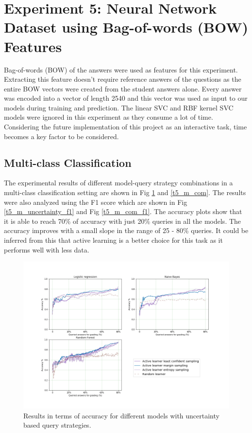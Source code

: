 \clearpage
\section{Experiment 5: Neural Network Dataset using Bag-of-words (BOW) Features}

Bag-of-words (BOW) of the answers were used as features for this experiment. Extracting this feature doesn't require reference answers of the questions as the entire BOW vectors were created from the student answers alone. Every answer was encoded into a vector of length 2540 and this vector was used as input to our models during training and prediction. The linear SVC and RBF kernel SVC models were ignored in this experiment as they consume a lot of time. Considering the future implementation of this project as an interactive task, time becomes a key factor to be considered.   

\subsection{Multi-class Classification}

The experimental results of different model-query strategy combinations in a multi-class classification setting are shown in Fig \ref{t5_m_uncertainty} and \ref{t5_m_com}. The results were also analyzed using the F1 score which are shown in Fig \ref{t5_m_uncertainty_f1} and Fig \ref{t5_m_com_f1}. The accuracy plots show that it is able to reach 70\% of accuracy with just 20\% queries in all the models. The accuracy improves with a small slope in the range of 25 - 80\% queries. It could be inferred from this that active learning is a better choice for this task as it performs well with less data. 

\begin{figure}[!htb]
	\centering
	\includegraphics[scale=0.45]{images/task5_accuracy_uncertainty}
	\caption{Results in terms of accuracy for different models with uncertainty based query strategies.}
	\label{t5_m_uncertainty}
\end{figure}

